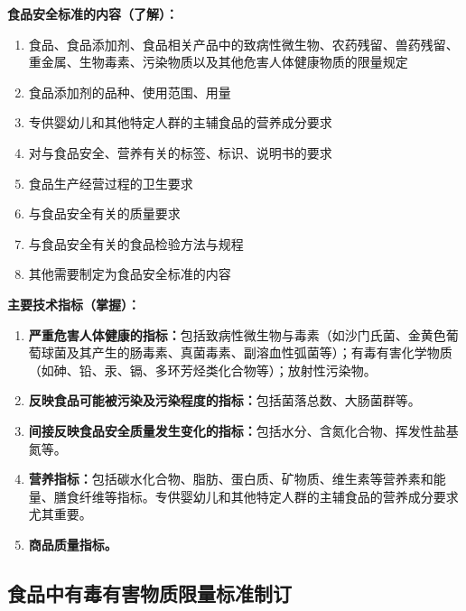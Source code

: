 \begin{keybox}
\textbf{食品安全标准的内容（了解）：}
\begin{enumerate}[leftmargin=*]
    \item 食品、食品添加剂、食品相关产品中的致病性微生物、农药残留、兽药残留、重金属、生物毒素、污染物质以及其他危害人体健康物质的限量规定
    \item 食品添加剂的品种、使用范围、用量
    \item 专供婴幼儿和其他特定人群的主辅食品的营养成分要求
    \item 对与食品安全、营养有关的标签、标识、说明书的要求
    \item 食品生产经营过程的卫生要求
    \item 与食品安全有关的质量要求
    \item 与食品安全有关的食品检验方法与规程
    \item 其他需要制定为食品安全标准的内容
\end{enumerate}

\textbf{主要技术指标（掌握）：}
\begin{enumerate}[leftmargin=*]
    \item \textbf{严重危害人体健康的指标：}包括致病性微生物与毒素（如沙门氏菌、金黄色葡萄球菌及其产生的肠毒素、真菌毒素、副溶血性弧菌等）；有毒有害化学物质（如砷、铅、汞、镉、多环芳烃类化合物等）；放射性污染物。
    \item \textbf{反映食品可能被污染及污染程度的指标：}包括菌落总数、大肠菌群等。
    \item \textbf{间接反映食品安全质量发生变化的指标：}包括水分、含氮化合物、挥发性盐基氮等。
    \item \textbf{营养指标：}包括碳水化合物、脂肪、蛋白质、矿物质、维生素等营养素和能量、膳食纤维等指标。专供婴幼儿和其他特定人群的主辅食品的营养成分要求尤其重要。
    \item \textbf{商品质量指标。}
\end{enumerate}
\end{keybox}

\subsection{食品中有毒有害物质限量标准制订}

